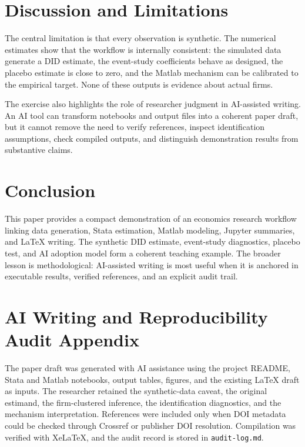 \documentclass[11pt]{article}
\begin{document}
\section{Discussion and Limitations}

The central limitation is that every observation is synthetic. The numerical estimates show that the workflow is internally consistent: the simulated data generate a DID estimate, the event-study coefficients behave as designed, the placebo estimate is close to zero, and the Matlab mechanism can be calibrated to the empirical target. None of these outputs is evidence about actual firms.

The exercise also highlights the role of researcher judgment in AI-assisted writing. An AI tool can transform notebooks and output files into a coherent paper draft, but it cannot remove the need to verify references, inspect identification assumptions, check compiled outputs, and distinguish demonstration results from substantive claims.

\section{Conclusion}

This paper provides a compact demonstration of an economics research workflow linking data generation, Stata estimation, Matlab modeling, Jupyter summaries, and \LaTeX{} writing. The synthetic DID estimate, event-study diagnostics, placebo test, and AI adoption model form a coherent teaching example. The broader lesson is methodological: AI-assisted writing is most useful when it is anchored in executable results, verified references, and an explicit audit trail.

\section{AI Writing and Reproducibility Audit Appendix}

The paper draft was generated with AI assistance using the project README, Stata and Matlab notebooks, output tables, figures, and the existing LaTeX draft as inputs. The researcher retained the synthetic-data caveat, the original estimand, the firm-clustered inference, the identification diagnostics, and the mechanism interpretation. References were included only when DOI metadata could be checked through Crossref or publisher DOI resolution. Compilation was verified with XeLaTeX, and the audit record is stored in \texttt{audit-log.md}.



\end{document}
